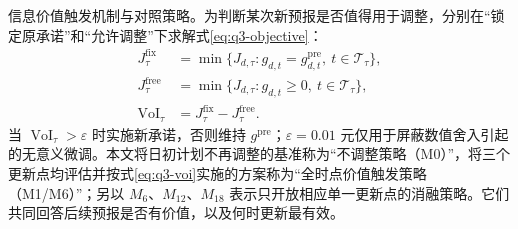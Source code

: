 \noindent 信息价值触发机制与对照策略。为判断某次新预报是否值得用于调整，分别在“锁定原承诺”和“允许调整”下求解式\eqref{eq:q3-objective}：
\begin{align}
J_{\tau}^{\mathrm{fix}}&=\min\{J_{d,\tau}:g_{d,t}=g_{d,t}^{\mathrm{pre}},\ t\in\mathcal T_\tau\},\\
J_{\tau}^{\mathrm{free}}&=\min\{J_{d,\tau}:g_{d,t}\ge0,\ t\in\mathcal T_\tau\},\\
\operatorname{VoI}_{\tau}&=J_{\tau}^{\mathrm{fix}}-J_{\tau}^{\mathrm{free}}.
\label{eq:q3-voi}
\end{align}
当 $\operatorname{VoI}_{\tau}>\varepsilon$ 时实施新承诺，否则维持 $g^{\mathrm{pre}}$；$\varepsilon=0.01$ 元仅用于屏蔽数值舍入引起的无意义微调。本文将日初计划不再调整的基准称为“不调整策略（M0）”，将三个更新点均评估并按式\eqref{eq:q3-voi}实施的方案称为“全时点价值触发策略（M1/M6）”；另以 $M_6$、$M_{12}$、$M_{18}$ 表示只开放相应单一更新点的消融策略。它们共同回答后续预报是否有价值，以及何时更新最有效。
